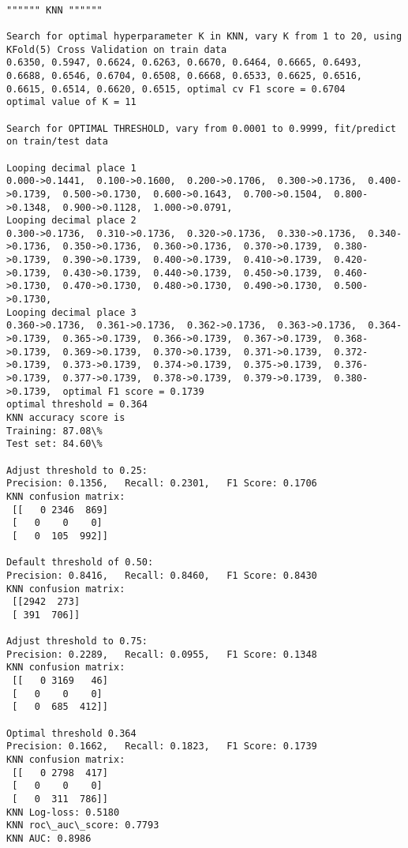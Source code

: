 \documentclass[11pt]{article}
\begin{document}
    \begin{Verbatim}[commandchars=\\\{\}]

"""""" KNN """"""

Search for optimal hyperparameter K in KNN, vary K from 1 to 20, using KFold(5) Cross Validation on train data
0.6350, 0.5947, 0.6624, 0.6263, 0.6670, 0.6464, 0.6665, 0.6493, 0.6688, 0.6546, 0.6704, 0.6508, 0.6668, 0.6533, 0.6625, 0.6516, 0.6615, 0.6514, 0.6620, 0.6515, optimal cv F1 score = 0.6704
optimal value of K = 11

Search for OPTIMAL THRESHOLD, vary from 0.0001 to 0.9999, fit/predict on train/test data

Looping decimal place 1
0.000->0.1441,  0.100->0.1600,  0.200->0.1706,  0.300->0.1736,  0.400->0.1739,  0.500->0.1730,  0.600->0.1643,  0.700->0.1504,  0.800->0.1348,  0.900->0.1128,  1.000->0.0791,  
Looping decimal place 2
0.300->0.1736,  0.310->0.1736,  0.320->0.1736,  0.330->0.1736,  0.340->0.1736,  0.350->0.1736,  0.360->0.1736,  0.370->0.1739,  0.380->0.1739,  0.390->0.1739,  0.400->0.1739,  0.410->0.1739,  0.420->0.1739,  0.430->0.1739,  0.440->0.1739,  0.450->0.1739,  0.460->0.1730,  0.470->0.1730,  0.480->0.1730,  0.490->0.1730,  0.500->0.1730,  
Looping decimal place 3
0.360->0.1736,  0.361->0.1736,  0.362->0.1736,  0.363->0.1736,  0.364->0.1739,  0.365->0.1739,  0.366->0.1739,  0.367->0.1739,  0.368->0.1739,  0.369->0.1739,  0.370->0.1739,  0.371->0.1739,  0.372->0.1739,  0.373->0.1739,  0.374->0.1739,  0.375->0.1739,  0.376->0.1739,  0.377->0.1739,  0.378->0.1739,  0.379->0.1739,  0.380->0.1739,  optimal F1 score = 0.1739
optimal threshold = 0.364
KNN accuracy score is
Training: 87.08\%
Test set: 84.60\%

Adjust threshold to 0.25:
Precision: 0.1356,   Recall: 0.2301,   F1 Score: 0.1706
KNN confusion matrix: 
 [[   0 2346  869]
 [   0    0    0]
 [   0  105  992]]

Default threshold of 0.50:
Precision: 0.8416,   Recall: 0.8460,   F1 Score: 0.8430
KNN confusion matrix: 
 [[2942  273]
 [ 391  706]]

Adjust threshold to 0.75:
Precision: 0.2289,   Recall: 0.0955,   F1 Score: 0.1348
KNN confusion matrix: 
 [[   0 3169   46]
 [   0    0    0]
 [   0  685  412]]

Optimal threshold 0.364
Precision: 0.1662,   Recall: 0.1823,   F1 Score: 0.1739
KNN confusion matrix: 
 [[   0 2798  417]
 [   0    0    0]
 [   0  311  786]]
KNN Log-loss: 0.5180
KNN roc\_auc\_score: 0.7793
KNN AUC: 0.8986

    \end{Verbatim}
\end{document}
